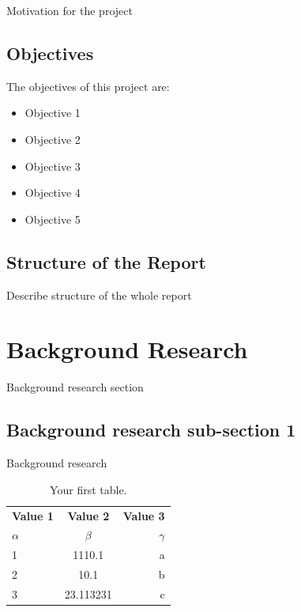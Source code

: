 \documentclass{mscreport}
\begin{document}
Motivation for the project

\subsection{Objectives}

The objectives of this project are:
\begin{itemize}
  \item Objective 1
  \item Objective 2
  \item Objective 3
  \item Objective 4
  \item Objective 5
\end{itemize}  
  
\subsection{Structure of the Report}

Describe structure of the whole report

\newpage

\section{Background Research}

Background research section

\subsection{Background research sub-section 1}

Background research 

\begin{table}[h!]
  \begin{center}
    \caption{Your first table.}
    \label{tab:table1}
    \begin{tabular}{l|c|r} %
      \textbf{Value 1} & \textbf{Value 2} & \textbf{Value 3}\\
      $\alpha$ & $\beta$ & $\gamma$ \\
      \hline
      1 & 1110.1 & a\\
      2 & 10.1 & b\\
      3 & 23.113231 & c\\
    \end{tabular}
  \end{center}
\end{table}
\end{document}

